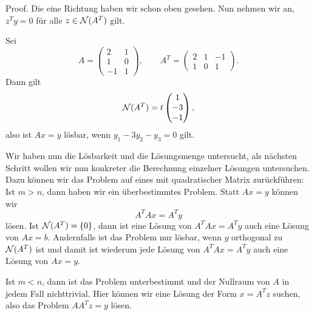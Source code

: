 \documentclass[letterpaper,10pt,english]{jupyterBook}
\begin{document}
\begin{emphBox}{}{}
Proof.  Die eine Richtung haben wir schon oben gesehen. Nun nehmen wir an, \(z^T y = 0\) für alle \(z \in {\cal N}(A^T)\) gilt.
\end{emphBox}
\label{vektorraeume/LGS:example-7}
\begin{example}{}{}



Sei
\begin{equation*}
A = \left(  \begin{matrix} 2 & 1 \\ 1  & 0 \\ -1 & 1\end{matrix} \right), \qquad A^T = \left(  \begin{matrix}
2 & 1 & -1 \\ 1 & 0 & 1 \end{matrix} \right).
\end{equation*}
Dann gilt
\begin{equation*}
 {\cal N}(A^T) = t \begin{pmatrix} 1 \\ - 3 \\ -1\end{pmatrix},
\end{equation*}
also ist \(Ax =y\) lösbar, wenn \(y_1 - 3y_2 -y_3 = 0\) gilt.
\end{example}

Wir haben nun die Lösbarkeit und die Lösungsmenge untersucht, als nächsten Schritt wollen wir nun konkreter die Berechnung einzelner Lösungen untersuchen. Dazu können wir das Problem auf eines mit quadratischer Matrix zurückführen: Ist \(m > n\), dann haben wir ein überbestimmtes Problem. Statt \(Ax = y\) können wir
\begin{equation*}
A^TA x = A^T y
\end{equation*}
lösen. Ist \({\cal N}(A^T) =\{0\}\), dann ist eine Lösung von \(A^T A x=A^Ty\) auch eine Lösung von \(Ax =b\). Andernfalls ist das Problem nur lösbar, wenn \(y\) orthogonal zu \({\cal N}(A^T)\) ist und damit ist wiederum jede Lösung von \(A^T A x=A^Ty\) auch eine Lösung von \(Ax =y\).

Ist \(m < n\), dann ist das Problem unterbestimmt und der Nullraum von \(A\) in jedem Fall nichttrivial. Hier können wir eine Lösung der Form \(x=A^T z\) suchen, also das Problem \(AA^T z = y\) lösen.
\end{document}
